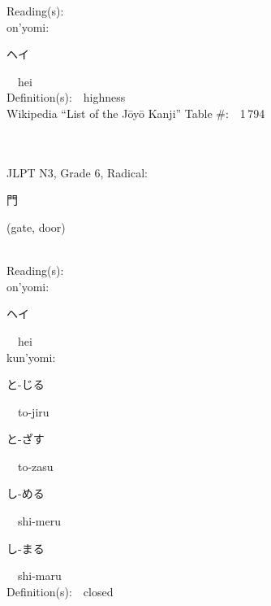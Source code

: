 \begin{multicols}{2}
Reading(s):\ \ \\
{\hspace*{1em}}on'yomi:\ \ \\
{\hspace*{2em}}{\begin{CJK}{UTF8}{min} ヘイ \end{CJK}}\ \ hei\ \ \\
Definition(s):\ \ highness \\
Wikipedia ``List of the J\=oy\=o Kanji'' Table \#:\ \ 1\,794 \\
\ \ \\
{\fontsize{34pt}{40pt}  }\ \ \\  %
{JLPT N3, Grade 6, Radical:\ \ {\begin{CJK}{UTF8}{min} 門 \end{CJK}} (gate, door) } \\
Reading(s):\ \ \\
{\hspace*{1em}}on'yomi:\ \ \\
{\hspace*{2em}}{\begin{CJK}{UTF8}{min} ヘイ \end{CJK}}\ \ hei\ \ \\
{\hspace*{1em}}kun'yomi:\ \ \\
{\hspace*{2em}}{\begin{CJK}{UTF8}{min} と-じる \end{CJK}}\ \ to-jiru\ \ \\
{\hspace*{2em}}{\begin{CJK}{UTF8}{min} と-ざす \end{CJK}}\ \ to-zasu\ \ \\
{\hspace*{2em}}{\begin{CJK}{UTF8}{min} し-める \end{CJK}}\ \ shi-meru\ \ \\
{\hspace*{2em}}{\begin{CJK}{UTF8}{min} し-まる \end{CJK}}\ \ shi-maru\ \ \\
Definition(s):\ \ closed \\

\end{multicols}
